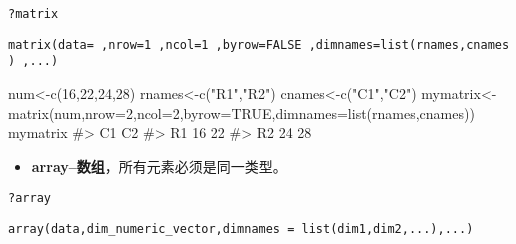 \documentclass[
  letterpaper,
  DIV=11,
  numbers=noendperiod]{scrreprt}
\newenvironment{Shaded}{\begin{snugshade}}{\end{snugshade}}
\newcommand{\AttributeTok}[1]{\textcolor[rgb]{0.40,0.45,0.13}{#1}}
\newcommand{\CommentTok}[1]{\textcolor[rgb]{0.37,0.37,0.37}{#1}}
\newcommand{\ConstantTok}[1]{\textcolor[rgb]{0.56,0.35,0.01}{#1}}
\newcommand{\DecValTok}[1]{\textcolor[rgb]{0.68,0.00,0.00}{#1}}
\newcommand{\FunctionTok}[1]{\textcolor[rgb]{0.28,0.35,0.67}{#1}}
\newcommand{\NormalTok}[1]{\textcolor[rgb]{0.00,0.23,0.31}{#1}}
\newcommand{\OtherTok}[1]{\textcolor[rgb]{0.00,0.23,0.31}{#1}}
\newcommand{\StringTok}[1]{\textcolor[rgb]{0.13,0.47,0.30}{#1}}
\providecommand{\tightlist}{%
  \setlength{\itemsep}{0pt}\setlength{\parskip}{0pt}}\usepackage{longtable,booktabs,array}
\begin{document}
\texttt{?matrix}

\texttt{matrix(data=\ ,nrow=1\ ,ncol=1\ ,byrow=FALSE\ ,dimnames=list(rnames,cnames)\ ,...)}

\begin{Shaded}
\begin{Highlighting}[]
\NormalTok{num}\OtherTok{\textless{}{-}}\FunctionTok{c}\NormalTok{(}\DecValTok{16}\NormalTok{,}\DecValTok{22}\NormalTok{,}\DecValTok{24}\NormalTok{,}\DecValTok{28}\NormalTok{)}
\NormalTok{rnames}\OtherTok{\textless{}{-}}\FunctionTok{c}\NormalTok{(}\StringTok{"R1"}\NormalTok{,}\StringTok{"R2"}\NormalTok{)}
\NormalTok{cnames}\OtherTok{\textless{}{-}}\FunctionTok{c}\NormalTok{(}\StringTok{"C1"}\NormalTok{,}\StringTok{"C2"}\NormalTok{)}
\NormalTok{mymatrix}\OtherTok{\textless{}{-}}\FunctionTok{matrix}\NormalTok{(num,}\AttributeTok{nrow=}\DecValTok{2}\NormalTok{,}\AttributeTok{ncol=}\DecValTok{2}\NormalTok{,}\AttributeTok{byrow=}\ConstantTok{TRUE}\NormalTok{,}\AttributeTok{dimnames=}\FunctionTok{list}\NormalTok{(rnames,cnames))}
\NormalTok{mymatrix   }
\CommentTok{\#\textgreater{}    C1 C2}
\CommentTok{\#\textgreater{} R1 16 22}
\CommentTok{\#\textgreater{} R2 24 28}
\end{Highlighting}
\end{Shaded}

\begin{itemize}
\tightlist
\item
  \textbf{array--数组}，所有元素必须是同一类型。
\end{itemize}

\texttt{?array}

\texttt{array(data,dim\_numeric\_vector,dimnames\ =\ list(dim1,dim2,...),...)}
\end{document}
